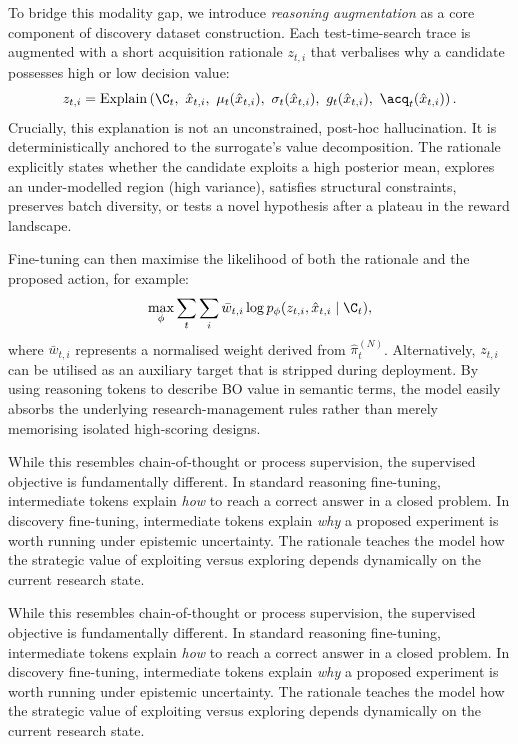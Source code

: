 To bridge this modality gap, we introduce \emph{reasoning augmentation} as a core component of discovery dataset construction. Each test-time-search trace is augmented with a short acquisition rationale $z_{t,i}$ that verbalises why a candidate possesses high or low decision value:\label{sec:reasoning-augmentation}
\[
  z_{t,i}
  =
  \operatorname{Explain}
  \left(
    \C_t,\ \hat{x}_{t,i},\ 
    \mu_t(\hat{x}_{t,i}),\ 
    \sigma_t(\hat{x}_{t,i}),\ 
    g_t(\hat{x}_{t,i}),\ 
    \acq_t(\hat{x}_{t,i})
  \right).
\]
Crucially, this explanation is not an unconstrained, post-hoc hallucination. It is deterministically anchored to the surrogate's value decomposition. The rationale explicitly states whether the candidate exploits a high posterior mean, explores an under-modelled region (high variance), satisfies structural constraints, preserves batch diversity, or tests a novel hypothesis after a plateau in the reward landscape. 

Fine-tuning can then maximise the likelihood of both the rationale and the proposed action, for example:
\[
  \max_\phi
  \sum_t\sum_i
  \bar{w}_{t,i}
  \log p_\phi(z_{t,i},\hat{x}_{t,i}\mid\C_t),
\]
where $\bar{w}_{t,i}$ represents a normalised weight derived from $\widehat{\pi}^{(N)}_t$. Alternatively, $z_{t,i}$ can be utilised as an auxiliary target that is stripped during deployment. By using reasoning tokens to describe BO value in semantic terms, the model easily absorbs the underlying research-management rules rather than merely memorising isolated high-scoring designs. 

While this resembles chain-of-thought or process supervision, the supervised objective is fundamentally different. In standard reasoning fine-tuning, intermediate tokens explain \emph{how} to reach a correct answer in a closed problem. In discovery fine-tuning, intermediate tokens explain \emph{why} a proposed experiment is worth running under epistemic uncertainty. The rationale teaches the model how the strategic value of exploiting versus exploring depends dynamically on the current research state.

While this resembles chain-of-thought or process supervision, the supervised objective is fundamentally different. In standard reasoning fine-tuning, intermediate tokens explain \emph{how} to reach a correct answer in a closed problem. In discovery fine-tuning, intermediate tokens explain \emph{why} a proposed experiment is worth running under epistemic uncertainty. The rationale teaches the model how the strategic value of exploiting versus exploring depends dynamically on the current research state. 

